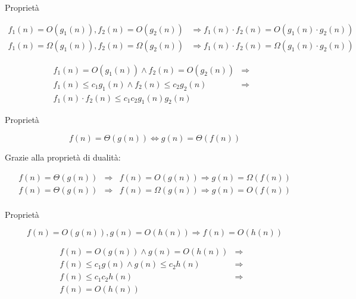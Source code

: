 \begin{frame}{Proprietà}

\begin{myboxtitle}
\small
\begin{align*}
  f_1(n) = O(g_1(n)), f_2(n) = O(g_2(n)) &\Rightarrow f_1(n) \cdot f_2(n) = O(g_1(n) \cdot g_2(n)) \\
  f_1(n) = \Omega(g_1(n)), f_2(n) = \Omega(g_2(n)) &\Rightarrow f_1(n) \cdot f_2(n) = \Omega(g_1(n) \cdot g_2(n)) 
\end{align*}
\end{myboxtitle}

\begin{myboxtitle}[Dimostrazione]
\begin{eqnarray*}
  f_1(n) = O(g_1(n)) \wedge f_2(n) = O(g_2(n)) &\Rightarrow& \\
    f_1(n) \leq c_1g_1(n) \wedge f_2(n) \leq c_2g_2(n) &\Rightarrow& \\
    f_1(n) \cdot f_2(n) \leq c_1c_2g_1(n)g_2(n)  
\end{eqnarray*}
\end{myboxtitle}

\end{frame}

\begin{frame}{Proprietà}

\begin{myboxtitle}[Simmetria]
	\[
	f(n) = \Theta(g(n)) \Leftrightarrow g(n) = \Theta(f(n))
	\]
\end{myboxtitle}

\begin{myboxtitle}[Dimostrazione]
Grazie alla proprietà di dualità:

\begin{eqnarray*}
  f(n) = \Theta(g(n)) &\Rightarrow& f(n) = O(g(n)) \Rightarrow g(n) = \Omega(f(n)) \\
  f(n) = \Theta(g(n)) &\Rightarrow& f(n) = \Omega(g(n)) \Rightarrow g(n) = O(f(n)) \\
\end{eqnarray*}
\end{myboxtitle}

\end{frame}

\begin{frame}{Proprietà}

\begin{myboxtitle}[Transitività]
\[
  f(n) = O(g(n)), g(n) = O(h(n)) \Rightarrow f(n) = O(h(n))
\]
\end{myboxtitle}

\begin{myboxtitle}[Dimostrazione]
\begin{eqnarray*}
  f(n) = O(g(n)) \wedge g(n) = O(h(n)) &\Rightarrow& \\
    f(n) \leq c_1g(n) \wedge g(n) \leq c_2h(n) &\Rightarrow& \\
    f(n) \leq c_1c_2h(n)  &\Rightarrow& \\
    f(n) = O(h(n)) &&
\end{eqnarray*}
\end{myboxtitle}

\end{frame}

